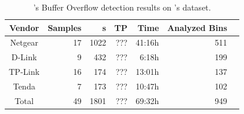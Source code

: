 \begin{table}[htbp]
	\centering
		
	\begin{adjustbox}{width=\columnwidth}
	\begin{tabular}{cr:rrrrr}
		\hline
		\textbf{Vendor} & \textbf{Samples} & \textbf{\trupoc{}s} & \textbf{TP} & \textbf{Time} & \textbf{Analyzed Bins} \\
		\hline
		Netgear & 17 & 
        1022 & ??? & 41:16h & 511 \\

		D-Link  &  9 & 
        432 & ??? & 6:18h & 199 \\

		TP-Link & 16 & 
        174 & ??? & 13:01h & 137\\

		Tenda   &  7 & 
        173  & ??? & 10:47h & 102\\
		\hline
        Total   & 49 &
        1801 & ??? & 69:32h & 949\\
        \hline
	\end{tabular}
	\end{adjustbox}
	\caption{\toolname's Buffer Overflow detection results on \karonte's dataset.}
	\label{tab:mango_overflow}
\end{table}

